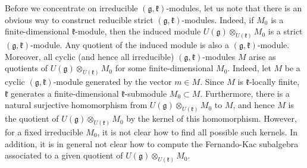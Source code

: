 \documentclass[12pt]{report}
\newcommand{\kk}{\mathfrak{k}}
\newcommand{\gG}{\mathfrak{g}}
\begin{document}
Before we concentrate on irreducible $(\gG,\kk)$-modules, let us note that there is an obvious way to construct reducible strict $(\gG,\kk)$-modules. Indeed, if $M_0$ is a finite-dimensional $\kk$-module, then the induced module $U(\gG)\otimes_{U(\kk)} M_0$ is a strict $(\gG,\kk)$-module. %
Any quotient of the induced module is also a $(\gG,\kk)$-module. Moreover, all cyclic (and hence all irreducible) $(\gG,\kk)$-modules $M$ arise as quotients of $U(\gG)\otimes_{U(\kk)} M_0$ for some finite-dimensional $M_0$. Indeed, let $M$ be a cyclic $(\gG,\kk)$-module generated by the vector $m\in M$. Since $M$ is $\kk$-locally finite, $\kk$ generates a finite-dimensional $\kk$-submodule $M_0\subset M$. Furthermore, there is a natural surjective homomorphism from $U(\gG)\otimes_{U(\kk)} M_0$ to $M$, and hence $M$ is the quotient of $U(\gG)\otimes_{U(\kk)} M_0$ by the kernel of this homomorphism. However, for a fixed irreducible $M_0$, it is not clear how to find all possible such kernels. In addition, it is in general not clear how to compute the Fernando-Kac subalgebra associated to a given quotient of  $U(\gG)\otimes_{U(\kk)} M_0$.
\end{document}
